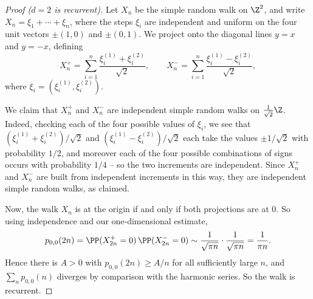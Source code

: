 \begin{center}
\end{center}

\begin{proof}[Proof ($d = 2$ is recurrent)]
	Let $X_n$ be the simple random walk on $\Z^2$, and write $X_n = \xi_1 + \cdots + \xi_n$, where the steps $\xi_i$ are independent and uniform on the four unit vectors $\pm(1, 0)$ and $\pm(0, 1)$. We project onto the diagonal lines $y = x$ and $y = -x$, defining
	$$
	X_n^+ = \sum_{i = 1}^{n} \frac{\xi_i^{(1)} + \xi_i^{(2)}}{\sqrt{2}}, \qquad X_n^- = \sum_{i = 1}^{n} \frac{\xi_i^{(1)} - \xi_i^{(2)}}{\sqrt{2}},
	$$
	where $\xi_i = (\xi_i^{(1)}, \xi_i^{(2)})$.

	We claim that $X_n^+$ and $X_n^-$ are independent simple random walks on $\frac{1}{\sqrt{2}}\Z$. Indeed, checking each of the four possible values of $\xi_i$, we see that $(\xi_i^{(1)} + \xi_i^{(2)})/\sqrt{2}$ and $(\xi_i^{(1)} - \xi_i^{(2)})/\sqrt{2}$ each take the values $\pm 1/\sqrt{2}$ with probability $1/2$, and moreover each of the four possible combinations of signs occurs with probability $1/4$ -- so the two increments are independent. Since $X_n^+$ and $X_n^-$ are built from independent increments in this way, they are independent simple random walks, as claimed.

	Now, the walk $X_n$ is at the origin if and only if both projections are at 0. So using independence and our one-dimensional estimate,
	$$
	p_{0, 0}(2n) = \PP(X_{2n}^+ = 0)\,\PP(X_{2n}^- = 0) \sim \frac{1}{\sqrt{\pi n}} \cdot \frac{1}{\sqrt{\pi n}} = \frac{1}{\pi n}.
	$$
	Hence there is $A > 0$ with $p_{0, 0}(2n) \geq A/n$ for all sufficiently large $n$, and $\sum_n p_{0, 0}(n)$ diverges by comparison with the harmonic series. So the walk is recurrent.
\end{proof}

